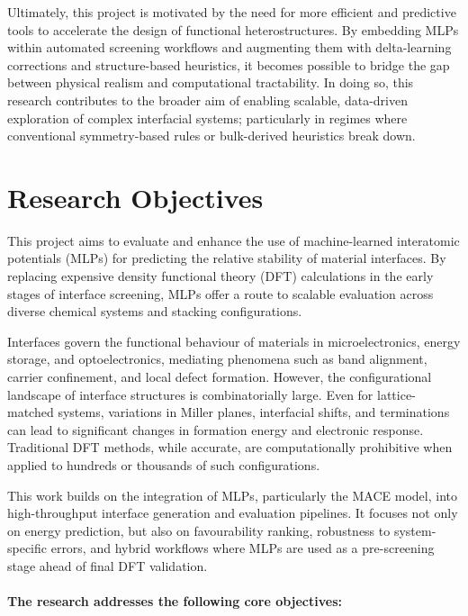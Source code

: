 Ultimately, this project is motivated by the need for more efficient and predictive tools to accelerate the design of
functional heterostructures. By embedding MLPs within automated screening workflows and augmenting them with
delta-learning corrections and structure-based heuristics, it becomes possible to bridge the gap between physical
realism and computational tractability. In doing so, this research contributes to the broader aim of enabling scalable,
data-driven exploration of complex interfacial systems; particularly in regimes where conventional symmetry-based rules
or bulk-derived heuristics break down.

\section{Research Objectives}
\label{section:research_objectives}

This project aims to evaluate and enhance the use of machine-learned interatomic potentials (MLPs) for predicting the
relative stability of material interfaces. By replacing expensive density functional theory (DFT) calculations in the
early stages of interface screening, MLPs offer a route to scalable evaluation across diverse chemical systems and
stacking configurations.

Interfaces govern the functional behaviour of materials in microelectronics, energy storage, and optoelectronics,
mediating phenomena such as band alignment, carrier confinement, and local defect formation. However, the
configurational landscape of interface structures is combinatorially large. Even for lattice-matched systems,
variations in Miller planes, interfacial shifts, and terminations can lead to significant changes in formation energy
and electronic response. Traditional DFT methods, while accurate, are computationally prohibitive when applied to
hundreds or thousands of such configurations.

This work builds on the integration of MLPs, particularly the MACE model, into high-throughput interface generation and
evaluation pipelines. It focuses not only on energy prediction, but also on favourability ranking, robustness to
system-specific errors, and hybrid workflows where MLPs are used as a pre-screening stage ahead of final DFT validation.

\paragraph{The research addresses the following core objectives:}

